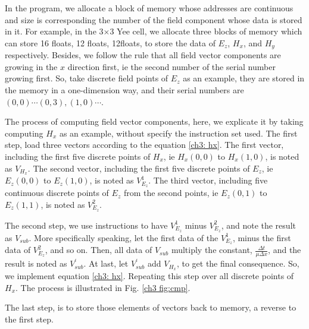 In the program, we allocate a block of memory whose addresses are continuous and size is corresponding the number of the field component whose data is stored in it. For example, in the 3$\times$3 Yee cell, we allocate three blocks of memory which can store 16 floats, 12 floats, 12floats, to store the data of $E_z$, $H_x$, and $H_y$ respectively. Besides, we follow the rule that all field vector components are growing in the $x$ direction first, ie the second number of the serial number growing first. So, take discrete field points of $E_z$ as an example, they are stored in the memory in a one-dimension way, and their serial numbers are $(0,0)\cdots(0,3),(1,0)\cdots$.

The process of computing field vector components, here, we explicate it by taking computing $H_x$ as an example, without specify the instruction set used. The first step, load three vectors according to the equation \eqref{ch3: hx}. The first vector, including the first five discrete points of $H_x$, ie $H_x(0,0)$ to $H_x(1,0)$, is noted as $V_{H_x}$. The second vector, including the first five discrete points of $E_z$, ie $E_z(0,0)$ to $E_z(1,0)$, is noted as $V_{E_z}^1$. The third vector, including five continuous discrete points of $E_z$ from the second points, ie $E_z(0,1)$ to $E_z(1,1)$, is noted as $V_{E_z}^2$.

The second step, we use instructions to have $V_{E_z}^1$ minus $V_{E_z}^2$, and note the result as $V_{sub}$. More specifically speaking, let the first data of the $V_{E_z}^1$, minus the first data of $V_{E_z}^2$, and so on. Then, all data of $V_{sub}$ multiply the constant, $\frac{\Delta t}{\mu\Delta x}$, and the result is noted as $V_{sub}^{'}$. At last, let $V_{sub}^{'}$ add $V_{H_x}$, to get the final consequence. So, we implement equation \eqref{ch3: hx}. Repeating this step over all discrete points of $H_x$. The process is illustrated in Fig. \ref{ch3 fig:cmp}.

The last step, is to store those elements of vectors back to memory, a reverse to the first step.

